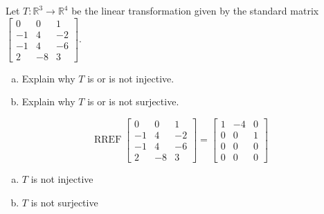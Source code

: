 
\begin{exerciseStatement}
 Let \(T:\mathbb{R}^ 3  \to \mathbb{R}^ 4 \) be the linear transformation given by the standard matrix \( \left[\begin{array}{ccc}
0 & 0 & 1 \\
-1 & 4 & -2 \\
-1 & 4 & -6 \\
2 & -8 & 3
\end{array}\right] .\)
\begin{enumerate}[(a)]
\item Explain why \(T\) is or is not injective.
\item Explain why \(T\) is or is not surjective.
\end{enumerate}
    
\end{exerciseStatement}
    
\begin{exerciseAnswer} 


\[\operatorname{RREF} \left[\begin{array}{ccc}
0 & 0 & 1 \\
-1 & 4 & -2 \\
-1 & 4 & -6 \\
2 & -8 & 3
\end{array}\right] = \left[\begin{array}{ccc}
1 & -4 & 0 \\
0 & 0 & 1 \\
0 & 0 & 0 \\
0 & 0 & 0
\end{array}\right] \]


\begin{enumerate}[(a)]
\item \(T\) is not injective
\item \(T\) is not surjective
\end{enumerate}
    
\end{exerciseAnswer}
    
